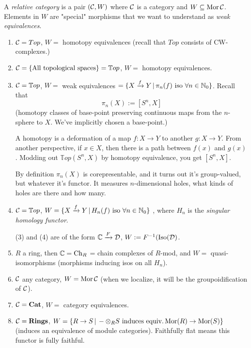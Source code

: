 \documentclass[class=report, crop=false,a4paper,twoside]{standalone}
\begin{document}
\begin{definition}
	A \emph{relative category} is a pair $(\mathcal{C}, W)$ where $\mathcal{C}$ is a category and $W \subseteq \operatorname{Mor}\mathcal{C}$. \\
	Elements in $W$ are "special" morphisms that we want to understand as \emph{weak equivalences}.
\end{definition}
	\begin{example}
		\begin{enumerate}
			\item $\mathcal{C} = Top$, $W =$ homotopy equivalences (recall that $Top$ consists of CW-complexes.)

			\item $\mathcal{C} = \{\text{All topological spaces}\} = \mathbb{T}op$, $W =$ homotopy equivalences. 
			\item $\mathcal{C} = \mathbb{T}op$, $W =$ weak equivalences $ = \{X \xrightarrow{f} Y \,|\, \pi_n(f) \text{ iso }\forall n \in \mathbb{N}_0\}$. Recall that
			\[
			\pi_n(X) := [S^n,X]
			\]
			(homotopy classes of base-point preserving continuous maps from the $n$-sphere to $X$. We've implicitly chosen a base-point.)

			A homotopy is a deformation of a map $f: X \to Y$ to another $g: X \to Y$. From another perspective, if $x \in X$, then there is a path between $f(x)$ and $g(x)$. Modding out $\mathbb{T}op(S^n,X)$ by homotopy equivalence, you get $[S^n,X]$. 

			By definition $\pi_n(X)$ is corepresentable, and it turns out it's group-valued, but whatever it's functor. It measures $n$-dimensional holes, what kinds of holes are there and how many.

			\item $\mathcal{C} = \mathbb{T}op$, $W = \{X \xrightarrow{f} Y \,|\, H_n(f) \text{ iso }\forall n \in \mathbb{N}_0\}$
				, where $H_n$ is the \emph{singular homology functor}.
				\begin{remark}
					(3) and (4) are of the form $\mathbb{C} \xrightarrow{F} \mathcal{D}$, $W := F^{-1}(\operatorname{Iso}(\mathcal{D})$.			
				\end{remark}

			\item $R$ a ring, then $\mathbb{C} = \operatorname{Ch}_R$ = chain complexes of $R$-mod, and $W = $ quasi-isomorphisms (morphisms inducing isos on all $H_n$).

			\item $\mathcal{C}$ any category, $W = \operatorname{Mor}\mathcal{C}$ (when we localize, it will be the groupoidification of $\mathcal{C}$). 

			\item $\mathcal{C} = \mathbf{Cat}$, $W = $ category equivalences. 

			\item $\mathcal{C} = \mathbf{Rings}$, $W = \{R \to S \,|\, - \otimes_R S \text{ induces equiv.} \operatorname{Mor}(R) \to \operatorname{Mor}(S)\}$ (induces an equivalence of module categories). Faithfully flat means this functor is fully faithful. 
		\end{enumerate}
	\end{example}
\end{document}
